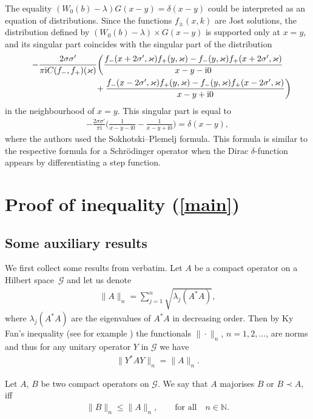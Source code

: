 \documentclass[11pt]{article}
\numberwithin{equation}{section}
\numberwithin{equation}{section}
\newcommand{\ii}{\mathrm{i}}
\begin{document}
The equality $(W_0(b) - \lambda)G(x-y) = \delta(x-y)$ could be interpreted as an equation of distributions.
Since the functions $f_{\pm}(x,k)$ are Jost solutions, the distribution defined by $(W_0(b) - \lambda)\times G(x-y)$ is supported only at $x = y$, and its singular part coincides with the singular part of the distribution
\begin{gather*}
-\frac{2\sigma\sigma'}{\pi \ii C(f_-,f_+)(\varkappa)} \bigg(\frac{f_-(x+2\sigma',\varkappa) f_+(y,\varkappa)- f_-(y,\varkappa)f_+(x+2\sigma',\varkappa)}{x-y-\ii0}
\\ \hphantom{-\frac{2\sigma\sigma'}{\pi \ii C(f_-,f_+)(\varkappa)} \bigg(}
{} + \frac{f_-(x-2\sigma',\varkappa) f_+(y,\varkappa)
- f_-(y,\varkappa)f_+(x-2\sigma',\varkappa)}{x-y+\ii0}\bigg)
\end{gather*}
in the neighbourhood of $x = y$. This singular part is equal to
\begin{gather*}
-\frac{2\sigma\sigma'}{\pi \ii} \bigg(\frac{1}{x-y-\ii0} - \frac{1}{x-y+\ii0} \bigg) = \delta(x-y),
\end{gather*}
where the authors used the Sokhotski--Plemelj formula. This formula is similar to the respective formula for a Schr\"odinger operator when the Dirac $\delta$-function appears by differentiating a step function.

\section[Proof of inequality (1.2)]{Proof of inequality (\ref{main})}

\subsection{Some auxiliary results}
We first collect some results from \cite{HLW} verbatim.
Let $A$ be a compact operator on a Hilbert space~$\mathcal{G}$ and let us denote
\begin{gather*}
\|A\|_n=\sum_{j=1}^n\sqrt{\lambda_j(A^*A)},
\end{gather*}
where $\lambda_j(A^*A)$ are the eigenvalues of $A^*A$ in decreasing order.
Then by Ky Fan's inequality (see for example \cite[Lemma~4.2]{GK}) the functionals $\|\cdot\|_n$, $n = 1,2,\dots $,
are norms and thus for any unitary operator $Y$ in $\mathcal{G}$ we have
\begin{gather*}
\|Y^* A Y\|_n = \|A\|_n.
\end{gather*}

\begin{Definition}
Let $A$, $B$ be two compact operators on $\mathcal{G}$. We say that $A$ majorises $B$ or $B\prec A$, iff
\begin{gather*}
\|B\|_n \le \|A\|_n, \qquad \text{for all} \quad n \in \mathbb N.
\end{gather*}
\end{Definition}
\end{document}
